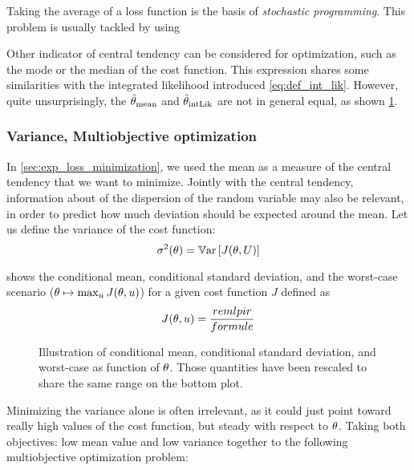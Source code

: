 \documentclass[../../Main_ManuscritThese.tex]{subfiles}
\newcommand\imgpath{/home/victor/acadwriting/Manuscrit/Text/Chapter3/img/}
\begin{document}
Taking the average of a loss function is the basis of \emph{stochastic programming}. This problem is usually tackled by using 

Other indicator of central tendency can be considered for optimization, such as the mode or the median of the cost function. 
This expression shares some similarities with the integrated likelihood introduced \cref{eq:def_int_lik}. However, quite unsurprisingly, the $\hat{\theta}_{\mathrm{mean}}$ and $\hat{\theta}_{\mathrm{intLik}}$ are not in general equal, as shown \cref{fig:difference_arithmetic_geometric_mean}.
\begin{figure}[ht]
  \centering
  
  \caption{\label{fig:difference_arithmetic_geometric_mean} }
\end{figure}


\subsubsection{Variance, Multiobjective optimization}
\label{sec:multiobjective_optimization}
In \cref{sec:exp_loss_minimization}, we used the mean as a measure of the central tendency that we want to minimize. Jointly with the central tendency,  information about of the dispersion of the random variable may also be relevant, in order to predict how much deviation should be expected around the mean.
Let us define the variance of the cost function:
\begin{equation}
  \sigma^2(\theta) = \mathbb{V}\mathrm{ar}\left[J(\theta,U)\right]
\end{equation}


 shows the conditional mean, conditional standard deviation, and the worst-case scenario ($\theta \mapsto \max_{u} J(\theta,u)$) for a given cost function $J$ defined as
\begin{equation}
  J(\theta,u) = \frac{remlpir}{formule}
\end{equation}
\begin{figure}[ht]
  \centering
  
  \caption{Illustration of conditional mean, conditional standard deviation, and worst-case as function of $\theta$. Those quantities have been rescaled to share the same range on the bottom plot.}
  \label{fig:mean_std_wc} 
\end{figure}

Minimizing the variance alone is often irrelevant, as it could just point toward really high values of the cost function, but steady with respect to  $\theta$. Taking both objectives: low mean value and low variance together to the following multiobjective optimization problem:
\end{document}

